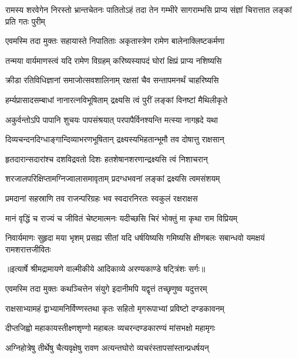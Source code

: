 \threelineshloka
{रामस्य शरवेगेन निरस्तो भ्रान्तचेतनः}
{पातितोऽहं तदा तेन गम्भीरे सागराम्भसि}
{प्राप्य संज्ञां चिरात्तात लङ्कां प्रति गतः पुरीम्} %

\twolineshloka
{एवमस्मि तदा मुक्तः सहायास्ते निपातिताः}
{अकृतास्त्रेण रामेण बालेनाक्लिष्टकर्मणा} %

\twolineshloka
{तन्मया वार्यमाणस्त्वं यदि रामेण विग्रहम्}
{करिष्यस्यापदं घोरां क्षिप्रं प्राप्य नशिष्यसि} %

\twolineshloka
{क्रीडा रतिविधिज्ञानां समाजोत्सवशालिनाम्}
{रक्षसां चैव सन्तापमनर्थं चाहरिष्यसि} %

\twolineshloka
{हर्म्यप्रासादसम्बाधां नानारत्नविभूषिताम्}
{द्रक्ष्यसि त्वं पुरीं लङ्कां विनष्टां मैथिलीकृते} %

\twolineshloka
{अकुर्वन्तोऽपि पापानि शुचयः पापसंश्रयात्}
{परपापैर्विनश्यन्ति मत्स्या नागह्रदे यथा} %

\twolineshloka
{दिव्यचन्दनदिग्धाङ्गान्दिव्याभरणभूषितान्}
{द्रक्ष्यस्यभिहतान्भूमौ तव दोषात्तु राक्षसान्} %

\twolineshloka
{हृतदारान्सदारांश्च दशविद्रवतो दिशः}
{हतशेषानशरणान्द्रक्ष्यसि त्वं निशाचरान्} %

\twolineshloka
{शरजालपरिक्षिप्तामग्निज्वालासमावृताम्}
{प्रदग्धभवनां लङ्कां द्रक्ष्यसि त्वमसंशयम्} %

\twolineshloka
{प्रमदानां सहस्राणि तव राजन्परिग्रहः}
{भव स्वदारनिरतः स्वकुलं रक्षराक्षस} %

\twolineshloka
{मानं वृद्धिं च राज्यं च जीवितं चेष्टमात्मनः}
{यदीच्छसि चिरं भोक्तुं मा कृथा राम विप्रियम्} %

\fourlineindentedshloka
{निवार्यमाणः सुहृदा मया भृशम्}
{प्रसह्य सीतां यदि धर्षयिष्यसि}
{गमिष्यसि क्षीणबलः सबान्धवो}
{यमक्षयं रामशरात्तजीवितः} %


{॥इत्यार्षे श्रीमद्रामायणे वाल्मीकीये आदिकाव्ये अरण्यकाण्डे षट्त्रिंशः सर्गः॥}


\twolineshloka
{एवमस्मि तदा मुक्तः कथञ्चित्तेन संयुगे}
{इदानीमपि यद्वृत्तं तच्छृणुष्व यदुत्तरम्} %

\twolineshloka
{राक्षसाभ्यामहं द्वाभ्यामनिर्विण्णस्तथा कृतः}
{सहितो मृगरूपाभ्यां प्रविष्टो दण्डकावनम्} %

\twolineshloka
{दीप्तजिह्वो महाकायस्तीक्ष्णशृण्गो महाबलः}
{व्यचरन्दण्डकारण्यं मांसभक्षो महामृगः} %

\twolineshloka
{अग्निहोत्रेषु तीर्थेषु चैत्यवृक्षेषु रावण}
{अत्यन्तघोरो व्यचरंस्तापसांस्तान्प्रधर्षयन्} %

